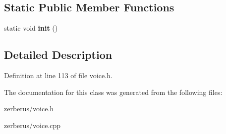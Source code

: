 \subsection*{Static Public Member Functions}
\begin{DoxyCompactItemize}
\item 
\mbox{\label{class_voice_ad5fd4f70ec360261c63d1b1702c59efa}} 
static void {\bfseries init} ()
\end{DoxyCompactItemize}


\subsection{Detailed Description}


Definition at line 113 of file voice.\+h.



The documentation for this class was generated from the following files\+:\begin{DoxyCompactItemize}
\item 
zerberus/voice.\+h\item 
zerberus/voice.\+cpp\end{DoxyCompactItemize}
